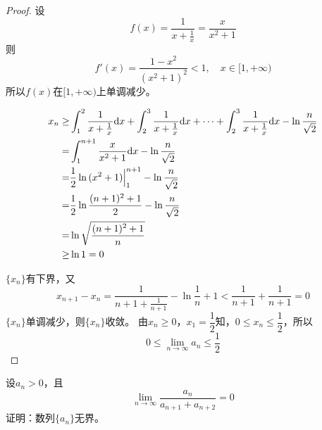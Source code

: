 \begin{proof}

    设
    $$f(x) = \dfrac{1}{x + \frac{1}{x}} = \dfrac{x}{x^2 + 1}$$
    则
    $$f'(x) = \dfrac{1 - x^2}{(x^2 + 1)^2} < 1, \quad x \in [1, +\infty)$$
    所以$f(x)$在$[1, +\infty)$上单调减少。

    \begin{align*}
        x_n \geq & \int_{1}^{2}{\dfrac{1}{x + \frac{1}{x}}}\mathrm{d} x + \int_{2}^{3}{\dfrac{1}{x + \frac{1}{x}}}\mathrm{d} x + \cdots + \int_{2}^{3}{\dfrac{1}{x + \frac{1}{x}}}\mathrm{d} x - \ln{\dfrac{n}{\sqrt{2}}} \\
        = & \int_{1}^{n + 1}{\dfrac{x}{x^2 + 1}}\mathrm{d} x - \ln{\dfrac{n}{\sqrt{2}}} \\
        = & \dfrac{1}{2} \ln{(x^2 + 1)} \Big|_{1}^{n + 1} - \ln{\dfrac{n}{\sqrt{2}}} \\
        = & \dfrac{1}{2} \ln{\dfrac{(n + 1)^2 + 1}{2}} - \ln{\dfrac{n}{\sqrt{2}}} \\
        = & \ln{\sqrt{\dfrac{(n + 1)^2 + 1}{n}}} \\
        \geq & \ln1 = 0 
    \end{align*}

    $\{x_n\}$有下界，又
    $$x_{n + 1} - x_n = \dfrac{1}{n + 1 + \frac{1}{n + 1}} - \ln{\dfrac{1}{n} + 1} < \dfrac{1}{n + 1} + \dfrac{1}{n + 1} = 0$$
    $\{x_n\}$单调减少，则$\{x_n\}$收敛。
    由$x_n \geq 0$，$x_1 = \dfrac{1}{2} $知，$0 \leq x_n \leq \dfrac{1}{2}$，所以
    $$0 \leq \lim\limits_{n \to \infty}{a_n} \leq \dfrac{1}{2}$$

\end{proof}

\begin{proposition}

    设$a_n > 0$，且
    $$\lim\limits_{n \to \infty}{\dfrac{a_n}{a_{n + 1} + a_{n + 2}}} = 0$$
    证明：数列$\{a_n\}$无界。
    
\end{proposition}

